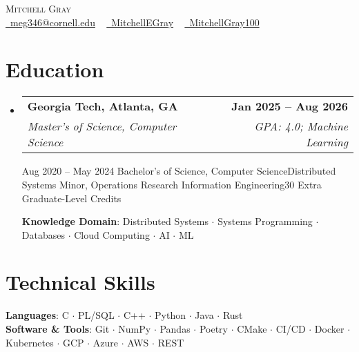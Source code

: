 \documentclass[letterpaper,11pt]{article}
\makeatletter
\newcommand{\resumeSpecialSubheadingCornell}[6]{
  \vspace{-2pt}\item
    \begin{tabular*}{1.0\textwidth}[t]{l@{\extracolsep{\fill}}r}
      \textbf{#1} & \textbf{\small #2} \\
      \textit{\small#3} & \textit{\small #4} \\
      \textit{\small#5} & \textit{\small #6} \\
    \end{tabular*}\vspace{-7pt}
}
\newcommand{\resumeSpecialSubheadingGT}[6]{
  \vspace{-2pt}\item
    \begin{tabular*}{1.0\textwidth}[t]{l@{\extracolsep{\fill}}r}
      \textbf{#1} & \textbf{\small #2} \\
      \textit{\small#3} & \textit{\small #4} \\
    \end{tabular*}\vspace{-7pt}
}
\newcommand{\resumeSubHeadingListStart}{\begin{itemize}[leftmargin=0.0in, label={}]}
\newcommand{\resumeSubHeadingListEnd}{\end{itemize}}
\makeatother
\begin{document}
\begin{center}
    {\Huge \scshape Mitchell Gray} \\ \vspace{1pt}
    \small
    \href{mailto:meg346@cornell.edu}{\faEnvelope\ meg346@cornell.edu} ~ 
    \href{https://www.linkedin.com/in/mitchellegray/}{\faLinkedin\ MitchellEGray}  ~
    \href{https://github.com/MitchellGray100}{\faGithub\ MitchellGray100}
    \vspace{-8pt}
\end{center}


\section{\textcolor{customred}{Education}}
  \resumeSubHeadingListStart
    \resumeSpecialSubheadingGT
      {Georgia Tech, Atlanta, GA}{Jan 2025 -- Aug 2026}
      {Master's of Science, Computer Science}{GPA: 4.0; Machine Learning}%


    \resumeSpecialSubheadingCornell
      {Cornell University, Ithaca, NY}{Aug 2020 -- May 2024}
      {Bachelor's of Science, Computer Science}{Distributed Systems}%
      {Minor, Operations Research Information Engineering}{30 Extra Graduate-Level Credits}

      \vspace{2pt}
      \textbf{Knowledge Domain}: Distributed Systems $\cdot$ Systems Programming $\cdot$ Databases $\cdot$ Cloud Computing 
      $\cdot$ AI $\cdot$ ML
      
    \resumeSubHeadingListEnd
\vspace{-18pt}

\section{\textcolor{customred}{Technical Skills}}
 \begin{itemize}[leftmargin=0.1in, label={}]
    \small{\item{
     \textbf{Languages}{: C $\cdot$ PL/SQL $\cdot$ C++ $\cdot$ Python $\cdot$ Java $\cdot$ Rust} \\
     \textbf{Software \& Tools}{: 
     Git $\cdot$ NumPy $\cdot$ Pandas $\cdot$ Poetry $\cdot$ CMake $\cdot$ CI/CD $\cdot$ Docker $\cdot$ Kubernetes $\cdot$ GCP $\cdot$ Azure $\cdot$ AWS $\cdot$ REST
     }\\
    }}
 \end{itemize}
 \vspace{-20pt}
\end{document}
